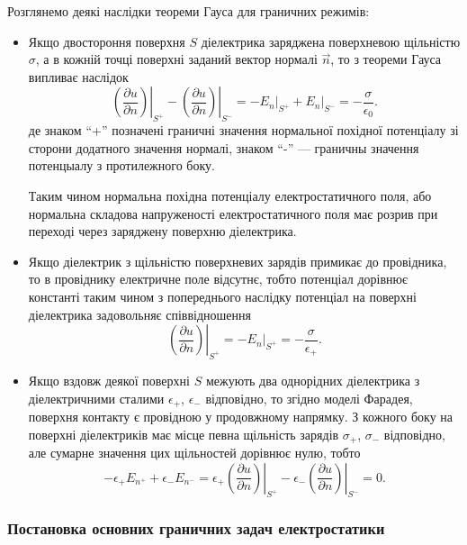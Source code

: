 Розглянемо деякі наслідки теореми Гауса для граничних режимів:
\begin{itemize}
	\item Якщо двостороння поверхня $S$ діелектрика заряджена поверхневою щільністю $\sigma$, а в кожній точці поверхні заданий вектор нормалі $\vec n$, то з теореми Гауса випливає наслідок
	\begin{equation}
		\left. \left( \frac{\partial u}{\partial n} \right) \right|_{S^+} - \left. \left( \frac{\partial u}{\partial n} \right) \right|_{S^-} = - \left. E_n \right|_{S^+} + \left. E_n \right|_{S^-} = -\frac{\sigma}{\epsilon_0}.
	\end{equation}
	де знаком ``+'' позначені граничні значення нормальної похідної потенціалу зі сторони додатного значення нормалі, знаком ``-'' --- граничны значення потенцыалу з протилежного боку. \medskip

	Таким чином нормальна похідна потенціалу електростатичного поля, або нормальна складова напруженості електростатичного поля має розрив при переході через заряджену поверхню діелектрика.

	\item Якщо діелектрик з щільністю поверхневих зарядів примикає до провідника, то в провіднику електричне поле відсутнє, тобто потенціал дорівнює константі таким чином з попереднього наслідку потенціал на поверхні діелектрика задовольняє співвідношення 
	\begin{equation}
		\left. \left( \frac{\partial u}{\partial n} \right) \right|_{S^+} = - \left. E_n \right|_{S^+} = -\frac{\sigma}{\epsilon_+}.
	\end{equation}

	\item Якщо вздовж деякої поверхні $S$ межують два однорідних діелектрика з діелектричними сталими $\epsilon_+$, $\epsilon_-$ відповідно, то згідно моделі Фарадея, поверхня контакту є провідною у продовжному напрямку. З кожного боку на поверхні діелектриків має місце певна щільність зарядів $\sigma_+$, $\sigma_-$ відповідно, але сумарне значення цих щільностей дорівнює нулю, тобто
	\begin{equation}
		-\epsilon_+ E_{n^+} + \epsilon_- E_{n^-} = \epsilon_+ \left. \left( \frac{\partial u}{\partial n}\right)\right|_{S^+} - \epsilon_- \left. \left( \frac{\partial u}{\partial n}\right)\right|_{S^-} = 0.
	\end{equation}
\end{itemize}

\subsubsection{Постановка основних граничних задач електростатики}

